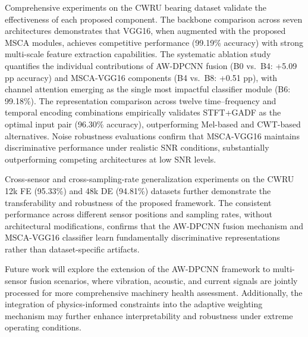 \documentclass[journal]{IEEEtran}
\begin{document}
Comprehensive experiments on the CWRU bearing dataset validate the effectiveness of each proposed component. The backbone comparison across seven architectures demonstrates that VGG16, when augmented with the proposed MSCA modules, achieves competitive performance (99.19\% accuracy) with strong multi-scale feature extraction capabilities. The systematic ablation study quantifies the individual contributions of AW-DPCNN fusion (B0 vs.\ B4: +5.09 pp accuracy) and MSCA-VGG16 components (B4 vs.\ B8: +0.51 pp), with channel attention emerging as the single most impactful classifier module (B6: 99.18\%). The representation comparison across twelve time--frequency and temporal encoding combinations empirically validates STFT+GADF as the optimal input pair (96.30\% accuracy), outperforming Mel-based and CWT-based alternatives. Noise robustness evaluations confirm that MSCA-VGG16 maintains discriminative performance under realistic SNR conditions, substantially outperforming competing architectures at low SNR levels.

Cross-sensor and cross-sampling-rate generalization experiments on the CWRU 12k FE (95.33\%) and 48k DE (94.81\%) datasets further demonstrate the transferability and robustness of the proposed framework. The consistent performance across different sensor positions and sampling rates, without architectural modifications, confirms that the AW-DPCNN fusion mechanism and MSCA-VGG16 classifier learn fundamentally discriminative representations rather than dataset-specific artifacts.

Future work will explore the extension of the AW-DPCNN framework to multi-sensor fusion scenarios, where vibration, acoustic, and current signals are jointly processed for more comprehensive machinery health assessment. Additionally, the integration of physics-informed constraints into the adaptive weighting mechanism may further enhance interpretability and robustness under extreme operating conditions.




\end{document}
